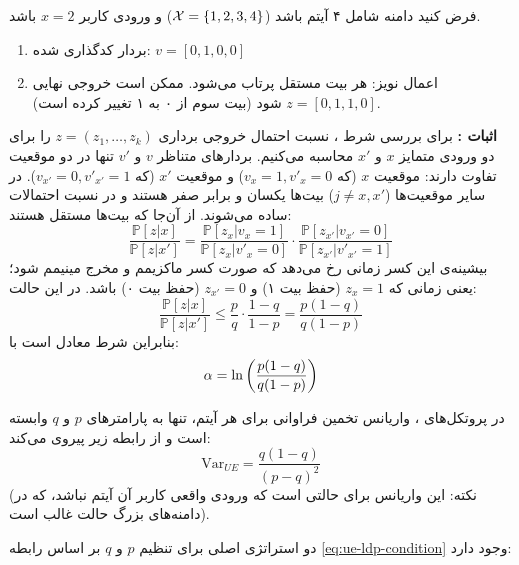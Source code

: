 \begin{مثال}
فرض کنید دامنه شامل ۴ آیتم باشد ($\Xset = \{1, 2, 3, 4\}$) و ورودی کاربر $x=2$ باشد.
\begin{enumerate}
    \item بردار کدگذاری شده: $v = [0, 1, 0, 0]$
    \item اعمال نویز: هر بیت مستقل پرتاب می‌شود. ممکن است خروجی نهایی $z = [0, 1, 1, 0]$ شود (بیت سوم از ۰ به ۱ تغییر کرده است).
\end{enumerate}
\end{مثال}

\textbf{اثبات \LDP:}
برای بررسی شرط \LDP، نسبت احتمال خروجی برداری $z = (z_1, \dots, z_k)$ را برای دو ورودی متمایز $x$ و $x'$ محاسبه می‌کنیم. بردارهای متناظر $v$ و $v'$ تنها در دو موقعیت تفاوت دارند: موقعیت $x$ (که $v_x=1, v'_x=0$) و موقعیت $x'$ (که $v_{x'}=0, v'_{x'}=1$). در سایر موقعیت‌ها ($j \neq x, x'$) بیت‌ها یکسان و برابر صفر هستند و در نسبت احتمالات ساده می‌شوند.
از آن‌جا که بیت‌ها مستقل هستند:
\begin{equation}
\frac{\mathbb{P}\left[z|x\right]}{\mathbb{P}\left[z|x'\right]} = \frac{\mathbb{P}\left[z_x|v_x=1\right]}{\mathbb{P}\left[z_x|v'_x=0\right]} \cdot \frac{\mathbb{P}\left[z_{x'}|v_{x'}=0\right]}{\mathbb{P}\left[z_{x'}|v'_{x'}=1\right]}
\end{equation}
بیشینه‌ی این کسر زمانی رخ می‌دهد که صورت کسر ماکزیمم و مخرج مینیمم شود؛ یعنی زمانی که $z_x=1$ (حفظ بیت ۱) و $z_{x'}=0$ (حفظ بیت ۰) باشد. در این حالت:
\begin{equation}
\frac{\mathbb{P}\left[z|x\right]}{\mathbb{P}\left[z|x'\right]} \le \frac{p}{q} \cdot \frac{1-q}{1-p} = \frac{p(1-q)}{q(1-p)}
\end{equation}
بنابراین شرط \LDP معادل است با:
\begin{equation}
\label{eq:ue-ldp-condition}
\alpha = \ln \left( \frac{p(1-q)}{q(1-p)} \right)
\end{equation}

\begin{لم}
در پروتکل‌های ، واریانس تخمین فراوانی برای هر آیتم، تنها به پارامترهای $p$ و $q$ وابسته است و از رابطه زیر پیروی می‌کند:
\begin{equation}
\mathrm{Var}_{UE} = \frac{q(1-q)}{(p-q)^2}
\end{equation}
(نکته: این واریانس برای حالتی است که ورودی واقعی کاربر آن آیتم نباشد، که در دامنه‌های بزرگ حالت غالب است).
\end{لم}

دو استراتژی اصلی برای تنظیم $p$ و $q$ بر اساس رابطه \eqref{eq:ue-ldp-condition} وجود دارد:

